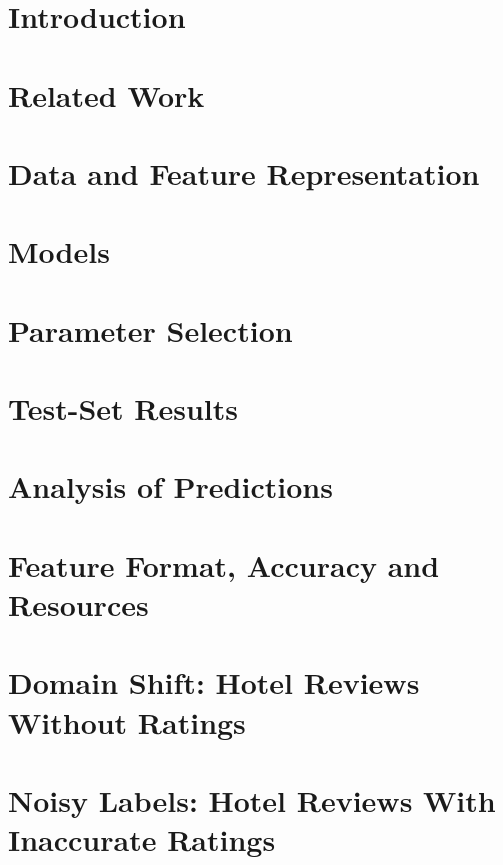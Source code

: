 \documentclass[11pt,a4paper]{article}
\begin{document}
\section{Introduction}\label{sec:intro}


\section{Related Work}\label{sec:related}





\section{Data and Feature Representation}\label{sec:data}


\section{Models}\label{sec:models}


\section{Parameter Selection}\label{sec:hparams}


\section{Test-Set Results}\label{sec:results}


\section{Analysis of Predictions}\label{sec:analysis}


\section{Feature Format, Accuracy and Resources}\label{sec:formats}


\section{Domain Shift: Hotel Reviews Without Ratings}\label{sec:hotel}


\section{Noisy Labels: Hotel Reviews With Inaccurate Ratings}\label{sec:noise}

\end{document}

